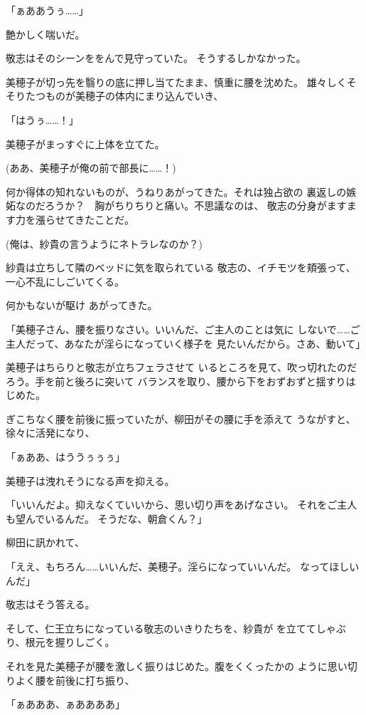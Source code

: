 ﻿\documentclass[
    book,tate,
    line_length=30zw,
    jafontsize=12pt,
    paper=b5j,
    landscape,
    ]{jlreq}
\begin{document}
「ぁああうぅ……」

艶かしく喘いだ。

敬志はそのシーンををんで見守っていた。
そうするしかなかった。

美穂子が切っ先を翳りの底に押し当てたまま、慎重に腰を沈めた。
雄々しくそそりたつものが美穂子の体内にまり込んでいき、

「はうぅ……！」

美穂子がまっすぐに上体を立てた。

(ああ、美穂子が俺の前で部長に……！)

何か得体の知れないものが、うねりあがってきた。それは独占欲の
裏返しの嫉妬なのだろうか？　胸がちりちりと痛い。不思議なのは、
敬志の分身がますます力を漲らせてきたことだ。

(俺は、紗貴の言うようにネトラレなのか？)

紗貴は立ちして隣のベッドに気を取られている
敬志の、イチモツを頬張って、一心不乱にしごいてくる。

何かもないが駆け
あがってきた。

「美穂子さん、腰を振りなさい。いいんだ、ご主人のことは気に
しないで……ご主人だって、あなたが淫らになっていく様子を
見たいんだから。さあ、動いて」

美穂子はちらりと敬志が立ちフェラさせて
いるところを見て、吹っ切れたのだろう。手を前と後ろに突いて
バランスを取り、腰から下をおずおずと揺すりはじめた。

ぎこちなく腰を前後に振っていたが、柳田がその腰に手を添えて
うながすと、徐々に活発になり、

「ぁああ、はううぅぅぅ」

美穂子は洩れそうになる声を抑える。

「いいんだよ。抑えなくていいから、思い切り声をあげなさい。
それをご主人も望んでいるんだ。 そうだな、朝倉くん？」

柳田に訊かれて、

「ええ、もちろん……いいんだ、美穂子。淫らになっていいんだ。
なってほしいんだ」

敬志はそう答える。

そして、仁王立ちになっている敬志のいきりたちを、紗貴が
を立ててしゃぶり、根元を握りしごく。

それを見た美穂子が腰を激しく振りはじめた。腹をくくったかの
ように思い切りよく腰を前後に打ち振り、

「ぁあああ、ぁああああ」
\end{document}
